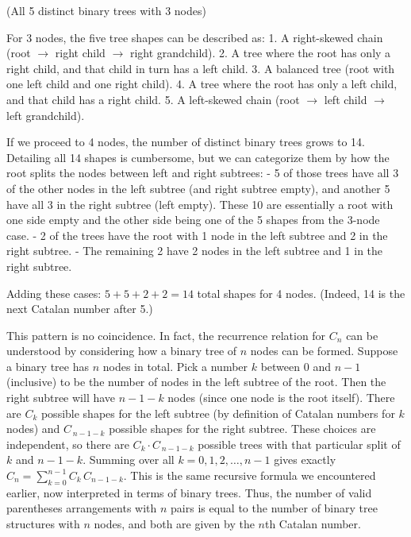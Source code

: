 \documentclass{article}
\begin{document}
\vspace{1ex}
\begin{center}
\small (All 5 distinct binary trees with 3 nodes)
\end{center}
\vspace{1ex}

For 3 nodes, the five tree shapes can be described as:
1. A right-skewed chain (root $\to$ right child $\to$ right grandchild).
2. A tree where the root has only a right child, and that child in turn has a left child.
3. A balanced tree (root with one left child and one right child).
4. A tree where the root has only a left child, and that child has a right child.
5. A left-skewed chain (root $\to$ left child $\to$ left grandchild).

If we proceed to 4 nodes, the number of distinct binary trees grows to 14. Detailing all 14 shapes is cumbersome, but we can categorize them by how the root splits the nodes between left and right subtrees:
- 5 of those trees have all 3 of the other nodes in the left subtree (and right subtree empty), and another 5 have all 3 in the right subtree (left empty). These 10 are essentially a root with one side empty and the other side being one of the 5 shapes from the 3-node case.
- 2 of the trees have the root with 1 node in the left subtree and 2 in the right subtree.
- The remaining 2 have 2 nodes in the left subtree and 1 in the right subtree.

Adding these cases: $5 + 5 + 2 + 2 = 14$ total shapes for 4 nodes. (Indeed, 14 is the next Catalan number after 5.)

This pattern is no coincidence. In fact, the recurrence relation for $C_n$ can be understood by considering how a binary tree of $n$ nodes can be formed. Suppose a binary tree has $n$ nodes in total. Pick a number $k$ between $0$ and $n-1$ (inclusive) to be the number of nodes in the left subtree of the root. Then the right subtree will have $n-1-k$ nodes (since one node is the root itself). There are $C_k$ possible shapes for the left subtree (by definition of Catalan numbers for $k$ nodes) and $C_{\,n-1-k}$ possible shapes for the right subtree. These choices are independent, so there are $C_k \cdot C_{\,n-1-k}$ possible trees with that particular split of $k$ and $n-1-k$. Summing over all $k=0,1,2,\dots,n-1$ gives exactly $C_n = \sum_{k=0}^{n-1} C_k\,C_{n-1-k}$. This is the same recursive formula we encountered earlier, now interpreted in terms of binary trees. Thus, the number of valid parentheses arrangements with $n$ pairs is equal to the number of binary tree structures with $n$ nodes, and both are given by the $n$th Catalan number.
\end{document}
